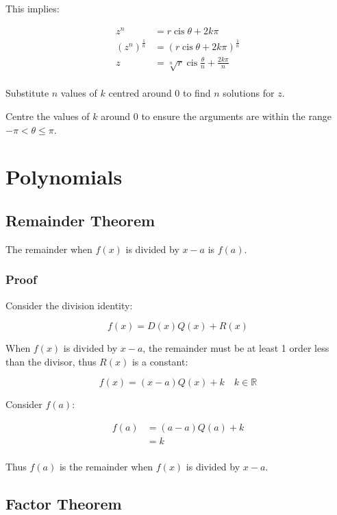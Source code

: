 \documentclass[a4paper,11pt]{report}
\DeclareMathOperator\cis{cis}
\begin{document}
This implies:

$$
\begin{aligned}
z^n & = r \cis{\theta + 2k\pi} \\
(z^n)^{\frac{1}{n}} & = (r \cis{\theta + 2k\pi})^{\frac{1}{n}} \\
z & = \sqrt[n]{r} \cis{\frac{\theta}{n} + \frac{2k\pi}{n}} \\
\end{aligned}
$$

Substitute $n$ values of $k$ centred around 0 to find $n$ solutions for $z$.

Centre the values of $k$ around 0 to ensure the arguments are within the range
$-\pi < \theta \leq \pi$.


\section{Polynomials}

\subsection{Remainder Theorem}

The remainder when $f(x)$ is divided by $x - a$ is $f(a)$.

\subsubsection{Proof}

Consider the division identity:

$$
f(x) = D(x) Q(x) + R(x)
$$

When $f(x)$ is divided by $x - a$, the remainder must be at least 1 order less
than the divisor, thus $R(x)$ is a constant:

$$
f(x) = (x - a) Q(x) + k \quad k \in \mathbb{R}
$$

Consider $f(a)$:

$$
\begin{aligned}
f(a) & = (a - a) Q(a) + k \\
& = k \\
\end{aligned}
$$

Thus $f(a)$ is the remainder when $f(x)$ is divided by $x - a$.

\subsection{Factor Theorem}
\end{document}
